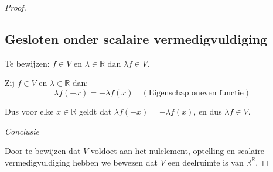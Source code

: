 \documentclass{article}
\newcommand{\R}{\mathbb{R}}
\newcommand{\en}{\text{ en }}
\newcommand{\dan}{\text{ dan }}
\begin{document}
\begin{proof}
    \subsection*{Gesloten onder scalaire vermedigvuldiging}
    Te bewijzen: $f \in V \en \lambda \in \R \dan \lambda f \in V$.

    Zij $f \in V \en \lambda \in \R$ dan:
    \[\lambda f(-x) = -\lambda f(x) \quad (\text{Eigenschap oneven functie})\]

    Dus voor elke $x \in \R$ geldt dat $\lambda f(-x) = -\lambda f(x)$, en dus $\lambda f \in V$.

    \bigskip

    \emph{Conclusie}

    Door te bewijzen dat $V$ voldoet aan het nulelement, optelling en scalaire vermedigvuldiging
    hebben we bewezen dat $V$ een deelruimte is van $\R^{\R}$.
\end{proof}
\end{document}
